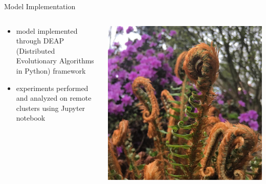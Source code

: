 \begin{frame}{Model Implementation}
\begin{columns}
\begin{column}{0.6\textwidth}
\begin{itemize}
\item model implemented through DEAP (Distributed Evolutionary Algorithms in Python) framework \cite{Fortin2012DEAP:Easy}
\item experiments performed and analyzed on remote clusters using Jupyter notebook
\end{itemize}
\end{column}
\begin{column}{0.4\textwidth}
\begin{center}
\includegraphics[width=\textwidth,trim={6cm 0 6cm 0},clip]{img/fuzzy_fern}
\end{center}
\end{column}
\end{columns}
\end{frame}





